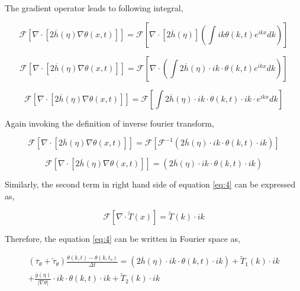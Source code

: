 \documentclass[a4paper,11pt,dvipsnames]{article}
\begin{document}
The gradient operator leads to following integral, 

\begin{equation}
\mathcal{F} \left [ \nabla \cdot \left [ 2 \overline{h}(\eta) \nabla \theta (x,t) \right ] \right ] = 
\mathcal{F} \left [ \nabla \cdot \left [ 2 \overline{h}(\eta) \right ] \left ( \int ik \theta (k,t) e^{ikx} dk \right ) \right ] \label{eq:7}
\end{equation}

\begin{equation}
\mathcal{F} \left [ \nabla \cdot \left [ 2 \overline{h}(\eta) \nabla \theta (x,t) \right ] \right ] = 
\mathcal{F} \left [ \nabla \cdot \left ( \int 2 \overline{h} (\eta) \cdot ik \cdot \theta (k,t) e^{ikx} dk \right ) \right ] \label{eq:8}
\end{equation}

\begin{equation}
\mathcal{F} \left [ \nabla \cdot \left [ 2 \overline{h}(\eta) \nabla \theta (x,t) \right ] \right ] = 
\mathcal{F} \left [ \int 2 \overline{h} (\eta) \cdot ik \cdot \theta (k,t) \cdot ik \cdot e^{ikx} dk \right ] \label{eq:9}
\end{equation}

Again invoking the definition of inverse fourier transform,

\begin{equation}
\mathcal{F} \left [ \nabla \cdot \left [ 2 \overline{h}(\eta) \nabla \theta (x,t) \right ] \right ] = 
\mathcal{F} \left [ \mathcal{F}^{-1} \left ( 2 \overline{h} (\eta) \cdot ik \cdot \theta (k,t) \cdot ik \right ) \right ] \label{eq:10}
\end{equation}

\begin{equation}
\mathcal{F} \left [ \nabla \cdot \left [ 2 \overline{h}(\eta) \nabla \theta (x,t) \right ] \right ] = 
\left ( 2 \overline{h} (\eta) \cdot ik \cdot \theta (k,t) \cdot ik \right ) \label{eq:11}
\end{equation}

Similarly, the second term in right hand side of equation \ref{eq:4} can be expressed as, 

\begin{equation}
\mathcal{F} \left [ \nabla \cdot \tilde{T}(x) \right ] = 
\tilde{T}(k) \cdot ik \label{eq:12}
\end{equation}

Therefore, the equation \ref{eq:4} can be written in Fourier space as, 

\begin{multline}
\left ( \overline{\tau}_\theta + \tilde{\tau}_\theta \right ) \frac{\theta (k,t) - \theta (k,t_o)}{\Delta t} = 
\left ( 2 \overline{h} (\eta) \cdot ik \cdot \theta (k,t) \cdot ik \right ) +  \tilde{T}_1 (k) \cdot ik \\ 
+ \frac{\overline{g}(\eta)}{\left | \nabla \theta \right |} \cdot ik \cdot \theta (k,t) \cdot ik + 
\tilde{T}_2 (k) \cdot ik \label{eq:13}
\end{multline}
\end{document}
